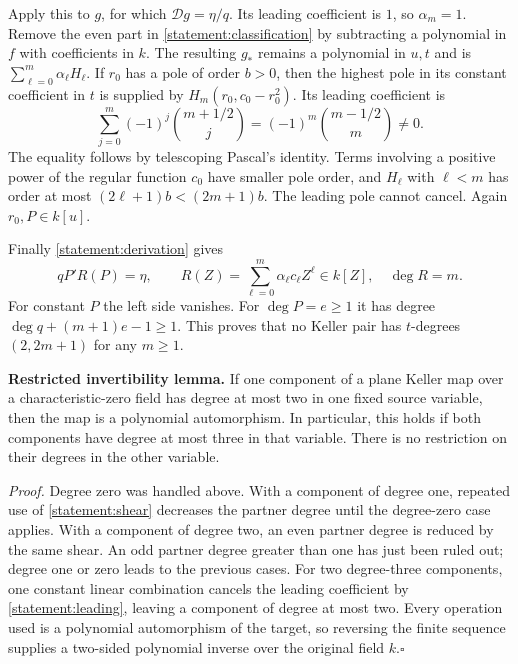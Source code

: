 \documentclass[11pt]{article}
\begin{document}
Apply this to $g$, for which $\mathcal Dg=\eta/q$. Its leading coefficient
is $1$, so $\alpha_m=1$. Remove the even part in
\eqref{statement:classification} by subtracting a polynomial in $f$ with
coefficients in $k$. The resulting $g_*$ remains a polynomial in $u,t$ and
is $\sum_{\ell=0}^m\alpha_\ell H_\ell$.
If $r_0$ has a pole of order $b>0$, then the highest pole in its constant
coefficient in $t$ is supplied by $H_m(r_0,c_0-r_0^2)$. Its leading
coefficient is
\begin{equation}\label{statement:binomialpole}
 \sum_{j=0}^m(-1)^j\binom{m+1/2}{j}
       =(-1)^m\binom{m-1/2}{m}\ne0.
\end{equation}
The equality follows by telescoping Pascal's identity. Terms involving a
positive power of the regular function $c_0$ have smaller pole order, and
$H_\ell$ with $\ell<m$ has order at most $(2\ell+1)b<(2m+1)b$.
The leading pole cannot cancel. Again $r_0,P\in k[u]$.

Finally \eqref{statement:derivation} gives
\begin{equation}\label{statement:oddcontradiction}
 qP'R(P)=\eta,
 \qquad R(Z)=\sum_{\ell=0}^m\alpha_\ell c_\ell Z^\ell\in k[Z],
 \quad \deg R=m.
\end{equation}
For constant $P$ the left side vanishes. For $\deg P=e\ge1$ it has degree
$\deg q+(m+1)e-1\ge1$. This proves that no Keller pair has $t$-degrees
$(2,2m+1)$ for any $m\ge1$.

\textbf{Restricted invertibility lemma.}
If one component of a plane Keller map over a characteristic-zero field
has degree at most two in one fixed source variable, then the map is a
polynomial automorphism. In particular, this holds if both components have
degree at most three in that variable. There is no restriction on their
degrees in the other variable.

\emph{Proof.} Degree zero was handled above. With a component of degree one,
repeated use of \eqref{statement:shear} decreases the partner degree until the
degree-zero case applies. With a component of degree two, an even partner
degree is reduced by the same shear. An odd partner degree greater than one
has just been ruled out; degree one or zero leads to the previous cases.
For two degree-three components, one constant linear combination cancels
the leading coefficient by \eqref{statement:leading}, leaving a component of
degree at most two. Every operation used is a polynomial automorphism of the
target, so reversing the finite sequence supplies a two-sided polynomial
inverse over the original field $k$.\hfill$\square$
\end{document}
